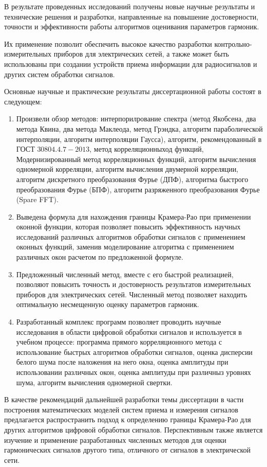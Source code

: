 В результате проведенных исследований получены новые научные результаты и технические решения и разработки, направленные на повышение достоверности, точности и эффективности работы алгоритмов оценивания параметров гармоник.

Их применение позволит обеспечить высокое качество разработки контрольно-измерительных приборов для электрических сетей, а также может быть использованы при создании устройств приема информации для радиосигналов и других систем обработки сигналов.

Основные научные и практические результаты диссертационной работы состоят в следующем:
\begin{enumerate}
  \item Произвели обзор методов: интерпорилрование спектра (метод Якобсена, два метода Квина, два метода Маклеода, метод Грэндка, алгоритм параболической интерполяции, алгоритм интерполяции Гаусса), алгоритм, рекомендованный в ГОСТ $30804.4.7-2013$, метод корреляционныход  функций, Модернизированный метод корреляционных функций, алгоритм вычисления одномерной корреляции, алгоритм вычисления двумерной корреляции, алгоритм дискретного преобразования Фурье (ДПФ), алгоритма быстрого преобразования Фурье (БПФ), алгоритм разряженного преобразования Фурье (Spare FFT). 
  \item Выведена формула для нахождения границы Крамера-Рао при применении оконной функции, которая позволяет повысить эффективность научных исследований различных алгоритмов обработки сигналов с применением оконных функций, заменив моделирование алгоритма с применением различных окон расчетом по предложенной формуле.
  \item Предложенный численный метод, вместе с его быстрой реализацией, позволяют повысить точность и достоверность результатов измерительных приборов для электрических сетей. Численный метод позволяет находить оптимальную несмещенную оценку параметров гармоник.
  \item Разработанный комплекс программ позволяет проводить научные исследования в области цифровой обработки сигналов и используется в учебном процессе: программа прямого корреляционного метода с использование быстрых алгоритмов обработки сигналов, оценка дисперсии белого шума после наложения на него окна, оценка амплитуды при использовании различных окон, оценка амплитуды при различныз уровнях шума, алгоритм вычисления одномерной свертки.
\end{enumerate}

В качестве рекомендаций дальнейшей разработки темы диссертации в части построения математических моделей систем приема и измерения сигналов предлагается распространить подход к определению границы Крамера-Рао для других алгоритмов цифровой обработки сигналов. Перспективным также является изучение и применение разработанных численных методов для оценки гармонических сигналов другого типа, отличного от сигналов в электрической сети.
